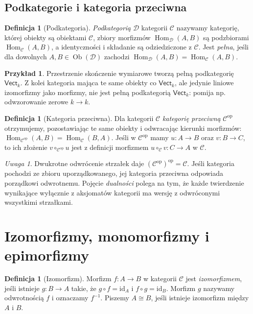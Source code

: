 \documentclass[11pt,a4paper]{article}
\numberwithin{equation}{section}
\theoremstyle{plain}
\theoremstyle{definition}
\newtheorem{definicja}[twierdzenie]{Definicja}
\newtheorem{przyklad}[twierdzenie]{Przykład}
\theoremstyle{remark}
\newtheorem{uwaga}[twierdzenie]{Uwaga}
\newcommand{\cat}[1]{\mathsf{#1}}
\newcommand{\Vect}{\cat{Vect}}
\newcommand{\id}{\mathrm{id}}
\newcommand{\Hom}{\operatorname{Hom}}
\newcommand{\Ob}{\operatorname{Ob}}
\newcommand{\op}{\mathrm{op}}
\begin{document}
\subsection{Podkategorie i kategoria przeciwna}

\begin{definicja}[Podkategoria]
\emph{Podkategorią} $\mathcal D$ kategorii $\mathcal C$ nazywamy kategorię, której obiekty są obiektami $\mathcal C$, zbiory morfizmów $\Hom_{\mathcal D}(A,B)$ są podzbiorami $\Hom_{\mathcal C}(A,B)$, a identyczności i składanie są odziedziczone z $\mathcal C$. Jest \emph{pełna}, jeśli dla dowolnych $A,B\in\Ob(\mathcal D)$ zachodzi $\Hom_{\mathcal D}(A,B)=\Hom_{\mathcal C}(A,B)$.
\end{definicja}

\begin{przyklad}
Przestrzenie skończenie wymiarowe tworzą pełną podkategorię $\Vect_k$. Z kolei kategoria mająca te same obiekty co $\Vect_k$, ale jedynie liniowe izomorfizmy jako morfizmy, nie jest pełną podkategorią $\Vect_k$: pomija np. odwzorowanie zerowe $k\to k$.
\end{przyklad}

\begin{definicja}[Kategoria przeciwna]\label{def:op}
Dla kategorii $\mathcal C$ \emph{kategorię przeciwną} $\mathcal C^{\op}$ otrzymujemy, pozostawiając te same obiekty i odwracając kierunki morfizmów: $\Hom_{\mathcal C^{\op}}(A,B)=\Hom_{\mathcal C}(B,A)$. Jeśli w $\mathcal C^{\op}$ mamy $u:A\to B$ oraz $v:B\to C$, to ich złożenie $v\circ_{\mathcal C^{\op}}u$ jest z definicji morfizmem $u\circ_{\mathcal C}v:C\to A$ w $\mathcal C$.
\end{definicja}

\begin{uwaga}
Dwukrotne odwrócenie strzałek daje $(\mathcal C^{\op})^{\op}=\mathcal C$. Jeśli kategoria pochodzi ze zbioru uporządkowanego, jej kategoria przeciwna odpowiada porządkowi odwrotnemu. Pojęcie \emph{dualności} polega na tym, że każde twierdzenie wynikające wyłącznie z aksjomatów kategorii ma wersję z odwróconymi wszystkimi strzałkami.
\end{uwaga}

\section{Izomorfizmy, monomorfizmy i epimorfizmy}\label{sec:morfizmy}

\begin{definicja}[Izomorfizm]
Morfizm $f:A\to B$ w kategorii $\mathcal C$ jest \emph{izomorfizmem}, jeśli istnieje $g:B\to A$ takie, że $g\circ f=\id_A$ i $f\circ g=\id_B$. Morfizm $g$ nazywamy odwrotnością $f$ i oznaczamy $f^{-1}$. Piszemy $A\cong B$, jeśli istnieje izomorfizm między $A$ i $B$.
\end{definicja}
\end{document}
